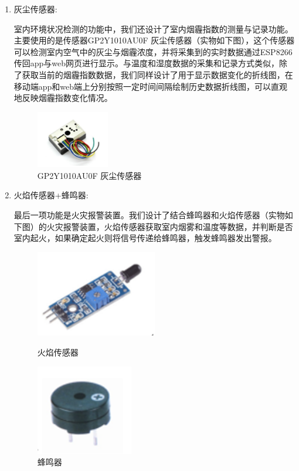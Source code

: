 \begin{enumerate}
    \item {灰尘传感器}:
    
    室内环境状况检测的功能中，我们还设计了室内烟霾指数的测量与记录功能。主要使用的是传感器GP2Y1010AU0F 灰尘传感器（实物如下图），这个传感器可以检测室内空气中的灰尘与烟霾浓度，并将采集到的实时数据通过ESP8266传回app与web网页进行显示。与温度和湿度数据的采集和记录方式类似，除了获取当前的烟霾指数数据，我们同样设计了用于显示数据变化的折线图，在移动端app和web端上分别按照一定时间间隔绘制历史数据折线图，可以直观地反映烟霾指数变化情况。
    \begin{figure}[htbp]
    \centering
    \includegraphics[width=0.3\textwidth]{figures/huichen}
    \caption{GP2Y1010AU0F 灰尘传感器}\label{fig:6}
    \end{figure}

    \item {火焰传感器+蜂鸣器}:
    
    最后一项功能是火灾报警装置。我们设计了结合蜂鸣器和火焰传感器（实物如下图）的火灾报警装置，火焰传感器获取室内烟雾和温度等数据，并判断是否室内起火，如果确定起火则将信号传递给蜂鸣器，触发蜂鸣器发出警报。

    \begin{figure}
        \centering
        \begin{minipage}{0.4\textwidth}
            \centering
            \includegraphics[width=0.5\textwidth]{figures/huoyan}
            \caption{火焰传感器}\label{fig:7}    
        \end{minipage}
        \begin{minipage}{0.4\textwidth}
            \centering
            \includegraphics[width=0.4\textwidth]{figures/fengming}
            \caption{蜂鸣器}\label{fig:8}    
        \end{minipage}
    \end{figure}
\end{enumerate}